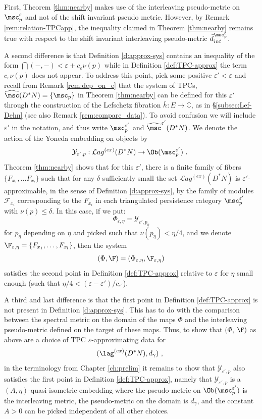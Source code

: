  First,  Theorem \ref{thm:nearby} makes use of the interleaving pseudo-metric on $\msc_{p}^{\varepsilon}$ and not of the shift invariant pseudo metric. However, by Remark \ref{rem:relation-TPCapp},  the inequality claimed in Theorem \ref{thm:nearby}  remains true with respect to the shift invariant interleaving pseudo-metric $\bar{d}^{\msc_{p}^{\varepsilon}}_{int}$. 

A second difference is that Definition \ref{d:approx-sys} contains an inequality 
of the form $ \dint (-, -) < \varepsilon + c_{\varepsilon}\nu(p)$ while in Definition \ref{def:TPC-approx} the  term $c_{\varepsilon}\nu(p)$ does not appear.  To address this point, pick some positive $\varepsilon' <\varepsilon$ and recall from Remark \ref{rem:dep_on_e} that the system of TPCs, $\widehat{\msc}
(D^{\ast}N) =\{\msc_{p} \}$ in Theorem \ref{thm:nearby} can be defined for this $\varepsilon'$
 through  the construction of the Lefschetz fibration  $\bar{h}:E\to \mathbb{C}$, as in \S\ref{subsec:Lef-Dehn} (see also Remark \ref{rem:compare_data}). To avoid confusion we will include  $\varepsilon'$ in the notation, and thus write $\msc_{p}^{\varepsilon'}$ and $\widehat{\msc}^{\varepsilon'}(D^{\ast}N)$. We  denote the action of the Yoneda embedding on objects by 
$$\mathcal{Y}_{\varepsilon',p}:\mathcal{L}ag^{(ex)}(D^{\ast}N) \to \Ob(\msc_{p}^{\varepsilon'})~.~$$
Theorem \ref{thm:nearby} shows that for this $\varepsilon' $,  there is a finite family of fibers $\{F_{x_{1}},\ldots F_{x_{l}}\}$ such that for any 
$\delta$ sufficiently small the set $\mathcal{L}ag^{(ex)}(D^{\ast}N)$ is $\varepsilon'$-approximable,
in the sense of Definition \ref{d:approx-sys},  by the family of modules $\mathscr{F}_{x_{i}}$ corresponding to the $F_{x_{i}}$ in each triangulated persistence category $\msc_{p}^{\varepsilon'}$ with $\nu(p) \leq \delta$.  In this case, if we put:
$$\Phi_{\varepsilon,\eta}= \mathcal{Y}_{\varepsilon', p_{\eta}}$$ for $p_{\eta}$ depending on $\eta$ and picked such that $\nu(p_{\eta})<\eta/4$,  and we denote $\F_{\varepsilon,\eta}=\{F_{x_{1}},\ldots, F_{x_{l}}\}$, then   the system $$(\Phi, \F)=(\Phi_{\varepsilon,\eta}, \F_{\varepsilon,\eta})$$ satisfies
the second point in Definition \ref{def:TPC-approx} relative to $\varepsilon$ for $\eta$ small enough (such that $\eta/4 < (\varepsilon -\varepsilon')/c_{\varepsilon'}$). 

A third and last difference is that the first point in Definition \ref{def:TPC-approx} is not 
present in Definition \ref{d:approx-sys}.  This has to do with the comparison between the spectral metric on the domain of the maps $\Phi$ and the interleaving pseudo-metric defined on the target of
these maps.
Thus, to show that $(\Phi$, $\F)$ as above are a choice of TPC $\varepsilon$-approximating data for $$(\lag^{(ex)}(D^{\ast}N), d_{\gamma})\ , \ $$ in the terminology from Chapter \ref{ch:prelim}
it remains to show that  $\mathcal{Y}_{\varepsilon', p}$ also satisfies the first point in Definition \ref{def:TPC-approx}, namely that $\mathcal{Y}_{\varepsilon', p}$ is  a $(A,\eta)$-quasi-isometric embedding  where 
the pseudo-metric on $\Ob (\msc_{p}^{\varepsilon'})$ is the interleaving metric, the pseudo-metric
on the domain is $d_{\gamma}$, and  the constant
$A>0$ can be picked independent of all other choices. 
 
